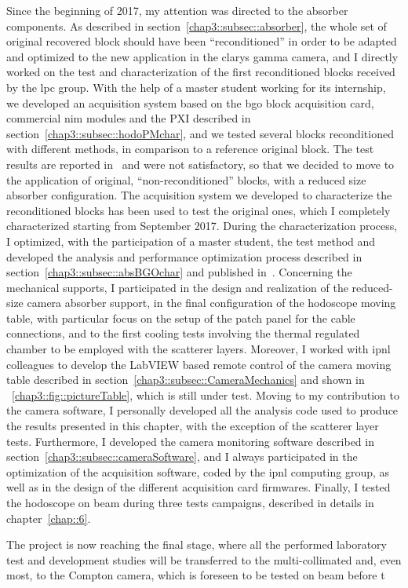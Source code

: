 Since the beginning of 2017, my attention was directed to the absorber components. As described in section~\ref{chap3::subsec::absorber}, the whole set of original recovered block should have been \enquote{reconditioned} in order to be adapted and optimized to the new application in the \gls{clarys} gamma camera, and I directly worked on the test and characterization of the first reconditioned blocks received by the \gls{lpc} group. With the help of a master student working for its internship, we developed an acquisition system based on the \gls{bgo} block acquisition card, commercial \gls{nim} modules and the PXI described in section~\ref{chap3::subsec::hodoPMchar}, and we tested several blocks reconditioned with different methods, in comparison to a reference original block. The test results are reported in~\cite{Sandjong2017} and were not satisfactory, so that we decided to move to the application of original, \enquote{non-reconditioned} blocks, with a reduced size absorber configuration. The acquisition system we developed to characterize the reconditioned blocks has been used to test the original ones, which I completely characterized starting from September 2017. During the characterization process, I optimized, with the participation of a master student, the test method and developed the analysis and performance optimization process described in section~\ref{chap3::subsec::absBGOchar} and published in~\cite{Fontana2018}. 
Concerning the mechanical supports, I participated in the design and realization of the reduced-size camera absorber support, in the final configuration of the hodoscope moving table, with particular focus on the setup of the patch panel for the cable connections, and to the first cooling tests involving the thermal regulated chamber to be employed with the scatterer layers. Moreover, I worked with \gls{ipnl} colleagues to develop the LabVIEW based remote control of the camera moving table described in section~\ref{chap3::subsec::CameraMechanics} and shown in \figurename~\ref{chap3::fig::pictureTable}, which is still under test. 
Moving to my contribution to the camera software, I personally developed all the analysis code used to produce the results presented in this chapter, with the exception of the scatterer layer tests. Furthermore, I developed the camera monitoring software described in section~\ref{chap3::subsec::cameraSoftware}, and I always participated in the optimization of the acquisition software, coded by the \gls{ipnl} computing group, as well as in the design of the different acquisition card firmwares.          
Finally, I tested the hodoscope on beam during three tests campaigns, described in details in chapter~\ref{chap::6}.

The project is now reaching the final stage, where all the performed laboratory test and development studies will be transferred to the multi-collimated and, even most, to the Compton camera, which is foreseen to be tested on beam before t%

\clearpage
